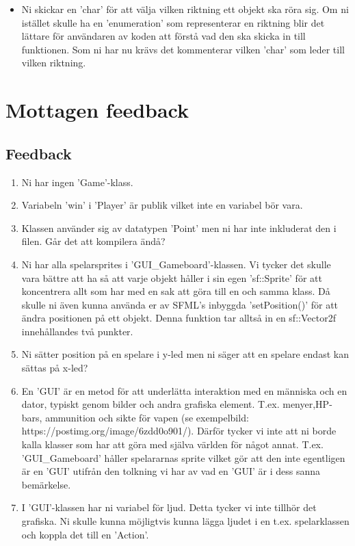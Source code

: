 \documentclass{TDP003mall}
\begin{document}
\begin{itemize}
\item Ni skickar en 'char' för att välja vilken riktning ett objekt ska röra sig. Om ni istället skulle ha en 'enumeration' som representerar en riktning blir det lättare för användaren av koden att förstå vad den ska skicka in till funktionen. Som ni har nu krävs det kommenterar vilken 'char' som leder till vilken riktning.
\end{itemize}

\newpage

\section{Mottagen feedback}
\subsection{Feedback}
\begin{enumerate}
\item Ni har ingen 'Game'-klass.
\item Variabeln 'win' i 'Player' är publik vilket inte en variabel bör vara.
\item Klassen använder sig av datatypen 'Point' men ni har inte inkluderat den i filen. Går det att kompilera ändå?
\item Ni har alla spelarsprites i 'GUI\_Gameboard'-klassen. Vi tycker det skulle vara bättre att ha så att varje objekt håller i sin egen 'sf::Sprite' för att koncentrera allt som har med en sak att göra till en och samma klass. Då skulle ni även kunna använda er av SFML's inbyggda 'setPosition()' för att ändra positionen på ett objekt. Denna funktion tar alltså in en sf::Vector2f innehållandes två punkter.
\item Ni sätter position på en spelare i y-led men ni säger att en spelare endast kan sättas på x-led?
\item En 'GUI' är en metod för att underlätta interaktion med en människa och en dator, typiskt genom bilder och andra grafiska element. T.ex. menyer,HP-bars, ammunition och sikte för vapen (se exempelbild: https://postimg.org/image/6zdd0o901/). Därför tycker vi inte att ni borde kalla klasser som har att göra med själva världen för något annat. T.ex. 'GUI\_Gameboard' håller spelararnas sprite vilket gör att den inte egentligen är en 'GUI' utifrån den tolkning vi har av vad en 'GUI' är i dess sanna bemärkelse.
\item I 'GUI'-klassen har ni variabel för ljud. Detta tycker vi inte tillhör det grafiska. Ni skulle kunna möjligtvis kunna lägga ljudet i en t.ex. spelarklassen och koppla det till en 'Action'.

\end{enumerate}
\end{document}
